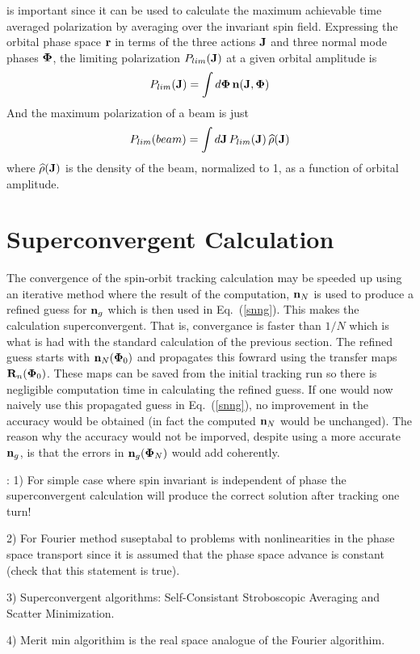 \documentclass[11pt,openany]{report}
\newcommand{\Bf}[1]{{\bf #1}}
\newcommand{\bfn}{{\Bf n}}
\newcommand{\bfr}{{\Bf r}}
\newcommand{\bfJ}{{\Bf J}}
\newcommand{\bfR}{{\Bf R}}
\newcommand{\bfPhi}{{\Bf \Phi}}
\newcommand{\Plim}{P_{lim}}
\newcommand{\Begineq}{\begin{equation}}
\newcommand{\Endeq}{\end{equation}}
\newcommand{\Eq}[1]{{Eq.~(\protect\ref{#1})}}
\begin{document}
is important since it can be used to
calculate the maximum achievable time averaged polarization by averaging over the invariant spin
field. Expressing the orbital phase space $\bfr$ in terms of the three actions $\bfJ$ and three normal
mode phases $\bfPhi$, the limiting polarization $\Plim(\bfJ)$ at a given orbital amplitude is
\Begineq
  \Plim(\bfJ) = \int d\bfPhi \, \bfn(\bfJ, \bfPhi)
\Endeq
And the maximum polarization of a beam is just
\Begineq
   \Plim(beam) = \int d\bfJ \, \Plim(\bfJ) \, \widehat\rho(\bfJ) 
\Endeq
where $\widehat\rho(\bfJ)$ is the density of the beam, normalized to 1, as a function of orbital
amplitude.

\section{Superconvergent Calculation}

The convergence of the spin-orbit tracking calculation may be speeded up using an iterative method
where the result of the computation, $\bfn_N$ is used to produce a refined guess for $\bfn_g$ which
is then used in \Eq{snng}. This makes the calculation superconvergent. That is, convergance is
faster than $1/N$ which is what is had with the standard calculation of the previous section. The
refined guess starts with $\bfn_N(\bfPhi_0)$ and propagates this fowrard using the transfer maps
$\bfR_n(\bfPhi_0)$. These maps can be saved from the initial tracking run so there is negligible
computation time in calculating the refined guess. If one would now naively use this propagated
guess in \Eq{snng}, no improvement in the accuracy would be obtained (in fact the computed $\bfn_N$
would be unchanged). The reason why the accuracy would not be imporved, despite using a more
accurate $\bfn_g$, is that the errors in $\bfn_g(\bfPhi_N)$ would add coherently. 



\Notes:
1) For simple case where spin invariant is independent of phase the superconvergent calculation will produce the
correct solution after tracking one turn!

2) For Fourier method suseptabal to problems with nonlinearities in the phase space transport since it is assumed
that the phase space advance is constant (check that this statement is true).

3) Superconvergent algorithms: Self-Consistant Stroboscopic Averaging and Scatter Minimization.

4) Merit min algorithim is the real space analogue of the Fourier algorithim.
\end{document}
